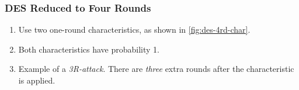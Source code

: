 \documentclass{beamer}
\begin{document}
    \begin{frame}
        \frametitle{DES Reduced to Four Rounds}
        \begin{enumerate}
            \item<1-> Use two one-round characteristics, as shown in
            \cref{fig:des-4rd-char}.
            \item<2-> Both characteristics have probability 1.
            \item<3-> Example of a \emph{3R-attack}. There are \emph{three}
            extra rounds after the characteristic is applied.
        \end{enumerate}
        
    \end{frame}
\end{document}
